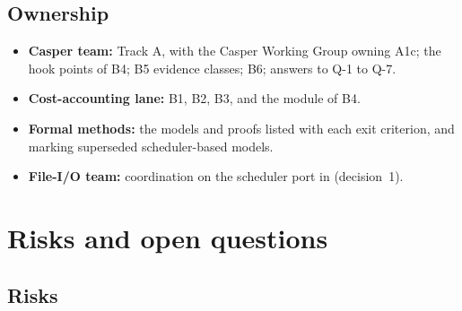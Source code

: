 \documentclass[11pt]{article}
\newcommand{\code}{\path}
\begin{document}
\subsection{Ownership}

\begin{itemize}
\item \textbf{Casper team:} Track A, with the Casper Working Group owning A1c; the hook points of B4; B5 evidence classes; B6; answers to Q-1 to Q-7.
\item \textbf{Cost-accounting lane:} B1, B2, B3, and the \code{v6} module of B4.
\item \textbf{Formal methods:} the models and proofs listed with each exit criterion, and marking superseded scheduler-based models.
\item \textbf{File-I/O team:} coordination on the scheduler port in \code{dev} (decision~1).
\end{itemize}

\section{Risks and open questions}

\subsection{Risks}
\end{document}
